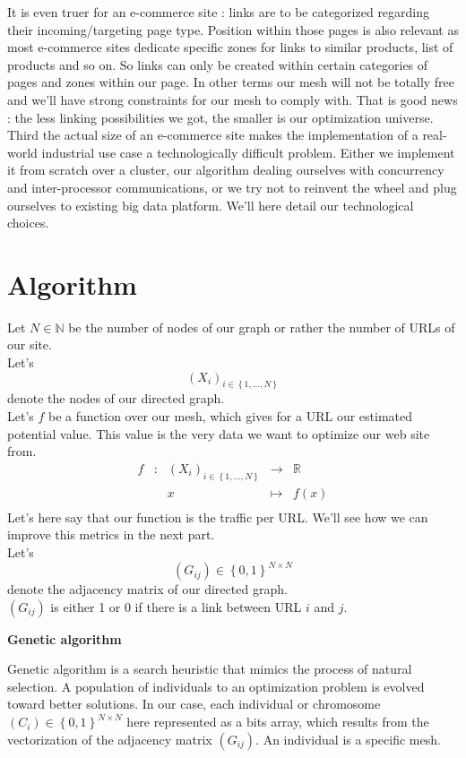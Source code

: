 \documentclass{iSWAGArticle}
\begin{document}
It is even truer for an e-commerce site : links are to be categorized regarding their incoming/targeting page type. Position within those pages
is also relevant as most e-commerce sites dedicate specific zones for links to similar products, list of products and so on.
So links can only be created within certain categories of pages and zones within our page. In other terms our mesh will not be totally free and 
we'll have strong constraints for our mesh to comply with. That is good news : the less linking possibilities we got, the smaller is our optimization universe.
\\
\indent
Third the actual size of an e-commerce site makes the implementation of a real-world industrial use case a technologically difficult problem.
Either we implement it from scratch over a cluster, our algorithm dealing ourselves with concurrency and inter-processor communications,
or we try not to reinvent the wheel and plug ourselves to existing big data platform. We'll here detail our technological choices.
\section{Algorithm}
Let $N \in \mathbb{N}$ be the number of nodes of our graph or rather the number of URLs of our site.
 \\\newline
Let's $$\left(X_i\right)_{i \in \left\{1,...,N\right\}}$$ denote the nodes of our directed graph.
 \\\newline
Let's $f$ be a function over our mesh, which gives for a URL our estimated potential value. This value is the
very data we want to optimize our web site from.
\begin{equation}
\begin{array}{ccccc}
f & : & \left(X_i\right)_{i \in \left\{1,...,N\right\}} & \to & \mathbb{R} \\
 & & x & \mapsto & f(x) \\
\end{array}
\end{equation}
Let's here say that our function is the traffic per URL. We'll see how we can improve this metrics in the next part.
 \\\newline
Let's $$\left(G_{ij}\right)  \in \left\{0,1\right\}^{N\times N}$$ denote the adjacency matrix of our directed graph.
 \\\newline
$\left(G_{ij}\right)$ is either 1 or 0 if there is a link between URL $i$ and $j$.
\begin{center}
\textbf{\large Genetic algorithm}
\end{center}
Genetic algorithm is a search heuristic that mimics the process of natural selection. 
A population of individuals to an optimization problem is evolved toward better solutions. 
In our case, each individual or chromosome $\left(C_{i}\right)  \in \left\{0,1\right\}^{N\times N}$ here represented as a bits array, which results from the vectorization of
the adjacency matrix $\left(G_{ij}\right)$. An individual is a specific mesh. 
\end{document}
